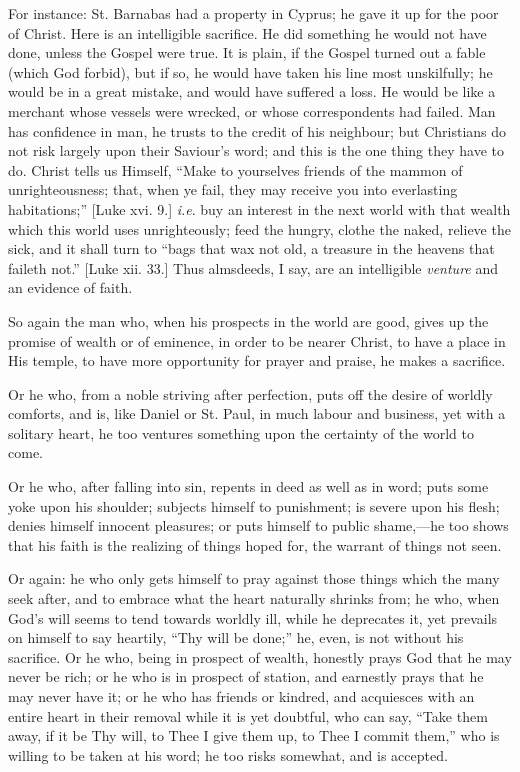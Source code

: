 For instance: St. Barnabas had a property in Cyprus; he gave it up
for the poor of Christ. Here is an intelligible sacrifice. He did
something he would not have done, unless the Gospel were true. It is
plain, if the Gospel turned out a fable (which God forbid), but if so,
he would have taken his line most unskilfully; he would be in a great
mistake, and would have suffered a loss. He would be like a merchant
whose vessels were wrecked, or whose correspondents had failed. Man
has confidence in man, he trusts to the credit of his neighbour; but
Christians do not risk largely upon their Saviour's word; and this is
the one thing they have to do. Christ tells us Himself, ``Make to
yourselves friends of the mammon of unrighteousness; that, when ye
fail, they may receive you into everlasting habitations;'' [Luke
xvi. 9.] \emph{i.e}. buy an interest in the next world with that
wealth which this world uses unrighteously; feed the hungry, clothe
the naked, relieve the sick, and it shall turn to ``bags that wax
not old, a treasure in the heavens that faileth not.'' [Luke xii.
33.] Thus almsdeeds, I say, are an intelligible \emph{venture} and an
evidence of faith.

So again the man who, when his prospects in the world are good,
gives up the promise of wealth or of eminence, in order to be nearer
Christ, to have a place in His temple, to have more opportunity for
prayer and praise, he makes a sacrifice.

Or he who, from a noble striving after perfection, puts off the
desire of worldly comforts, and is, like Daniel or St. Paul, in much
labour and business, yet with a solitary heart, he too ventures
something upon the certainty of the world to come.

Or he who, after falling into sin, repents in deed as well as in
word; puts some yoke upon his shoulder; subjects himself to
punishment; is severe upon his flesh; denies himself innocent
pleasures; or puts himself to public shame,—he too shows that his
faith is the realizing of things hoped for, the warrant of things not
seen.

Or again: he who only gets himself to pray against those things
which the many seek after, and to embrace what the heart naturally
shrinks from; he who, when God's will seems to tend towards worldly
ill, while he deprecates it, yet prevails on himself to say heartily,
``Thy will be done;'' he, even, is not without his sacrifice.
Or he who, being in prospect of wealth, honestly prays God that he may
never be rich; or he who is in prospect of station, and earnestly
prays that he may never have it; or he who has friends or kindred, and
acquiesces with an entire heart in their removal while it is yet
doubtful, who can say, ``Take them away, if it be Thy will, to
Thee I give them up, to Thee I commit them,'' who is willing to be
taken at his word; he too risks somewhat, and is accepted.

